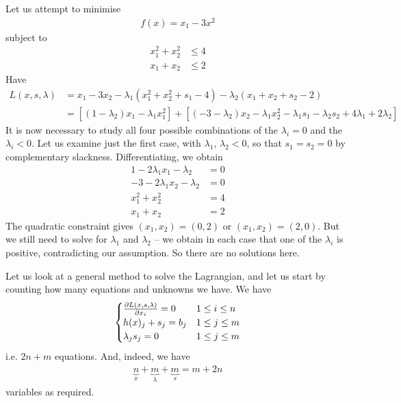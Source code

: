 \documentclass{../template/note}
\begin{document}
    \begin{example*}
        Let us attempt to minimise
        \begin{align*}
            f(x) = x_1-3x^2
        \end{align*}
        subject to
        \begin{align*}
            x_1^2+x_2^2 &\leq 4 \\
            x_1+x_2 &\leq 2
        \end{align*}
        Have
        \begin{align*}
            L(x, s, \lambda) &= x_1 - 3x_2 - \lambda_1(x_1^2+x_2^2+s_1-4) - \lambda_2(x_1+x_2+s_2-2) \\
            &= [(1-\lambda_2)x_1 - \lambda_1x_1^2] + [(-3-\lambda_2)x_2-\lambda_1x_2^2 - \lambda_1s_1 - \lambda_2s_2 + 4\lambda_1 + 2\lambda_2]
        \end{align*}
        It is now necessary to study all four possible combinations of the $\lambda_i = 0$ and the $\lambda_i < 0$. Let us examine just the first case, with $\lambda_1$, $\lambda_2 < 0$, so that $s_1 = s_2 = 0$ by complementary slackness. Differentiating, we obtain
        \begin{align*}
            1-2\lambda_1x_1-\lambda_2 &= 0 \\
            -3-2\lambda_1x_2-\lambda_2 &= 0 \\
            x_1^2+x_2^2 &= 4 \\
            x_1+x_2 &= 2
        \end{align*}
        The quadratic constraint gives $(x_1, x_2) = (0, 2)$ or $(x_1, x_2) = (2, 0)$. But we still need to solve for $\lambda_1$ and $\lambda_2$ -- we obtain in each case that one of the $\lambda_i$ is positive, contradicting our assumption. So there are no solutions here.        
    \end{example*}
    

    Let us look at a general method to solve the Lagrangian, and let us start by counting how many equations and unknowns we have. We have
    \begin{align*}
        \begin{cases}
            \pd{L(x,s,\lambda)}{x_i} = 0 & 1 \leq i \leq n\\
            h(x)_j + s_j = b_j & 1 \leq j \leq m \\
            \lambda_j s_j = 0 & 1 \leq j \leq m
        \end{cases}
    \end{align*}
    i.e. $2n+m$ equations. And, indeed, we have
    \begin{align*}
        \underbrace n_x + \underbrace m_\lambda + \underbrace m_s = m+2n
    \end{align*}
    variables as required.
\end{document}
